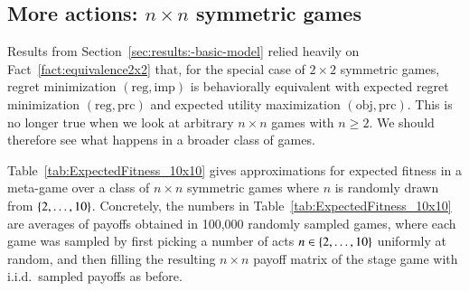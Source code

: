 \documentclass[fleqn,reqno,11pt]{article}
\begin{document}
                                   
\subsection{More actions: $n \times n$ symmetric games}
\label{sec:n-times-n}

Results from Section~\ref{sec:results:-basic-model} relied heavily on
Fact~\ref{fact:equivalence2x2} that, for the special case of $2 \times 2$ symmetric games,
regret minimization $(\text{reg}, \text{imp})$ is behaviorally equivalent with expected
regret minimization $(\text{reg}, \text{prc})$ and expected utility maximization
$(\text{obj}, \text{prc})$. This is no longer true when we look at arbitrary $n \times n$
games with $n \ge 2$. We should therefore see what happens in a broader class of games.

Table~\ref{tab:ExpectedFitness_10x10} gives approximations for expected fitness in a
meta-game over a class of $n \times n$ symmetric games where $n$ is randomly drawn from
$\left\{2, \dots, 10\right\}$. Concretely, the numbers in Table~\ref{tab:ExpectedFitness_10x10} are
averages of payoffs obtained in 100,000 randomly sampled games, where each game was sampled by
first picking a number of acts $n \in \left\{2, \dots, 10\right\}$ uniformly at random, and then filling
the resulting $n \times n$ payoff matrix of the stage game with i.i.d.~sampled payoffs as
before.
\end{document}
